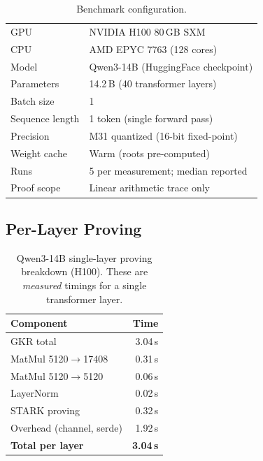 \documentclass[10pt,twocolumn]{article}
\theoremstyle{definition}
\theoremstyle{remark}
\begin{document}
\begin{table}[t]
  \centering\small
  \caption{Benchmark configuration.}
  \label{tab:setup}
  \begin{tabular}{@{}ll@{}}
    \toprule
    GPU              & NVIDIA H100 80\,GB SXM \\
    CPU              & AMD EPYC 7763 (128 cores) \\
    Model            & Qwen3-14B (HuggingFace checkpoint) \\
    Parameters       & 14.2\,B (40 transformer layers) \\
    Batch size       & 1 \\
    Sequence length  & 1 token (single forward pass) \\
    Precision        & M31 quantized (16-bit fixed-point) \\
    Weight cache     & Warm (roots pre-computed) \\
    Runs             & 5 per measurement; median reported \\
    Proof scope      & Linear arithmetic trace only \\
    \bottomrule
  \end{tabular}
\end{table}

\subsection{Per-Layer Proving}

\begin{table}[t]
  \centering\small
  \caption{Qwen3-14B single-layer proving breakdown (H100).
           These are \emph{measured} timings for a single
           transformer layer.}
  \label{tab:proving}
  \begin{tabular}{@{}lr@{}}
    \toprule
    \textbf{Component} & \textbf{Time} \\
    \midrule
    GKR total                & 3.04\,s \\
    \quad MatMul 5120$\to$17408 & 0.31\,s \\
    \quad MatMul 5120$\to$5120  & 0.06\,s \\
    \quad LayerNorm             & 0.02\,s \\
    STARK proving            & 0.32\,s \\
    Overhead (channel, serde) & 1.92\,s \\
    \midrule
    \textbf{Total per layer} & \textbf{3.04\,s} \\
    \bottomrule
  \end{tabular}
\end{table}
\end{document}
